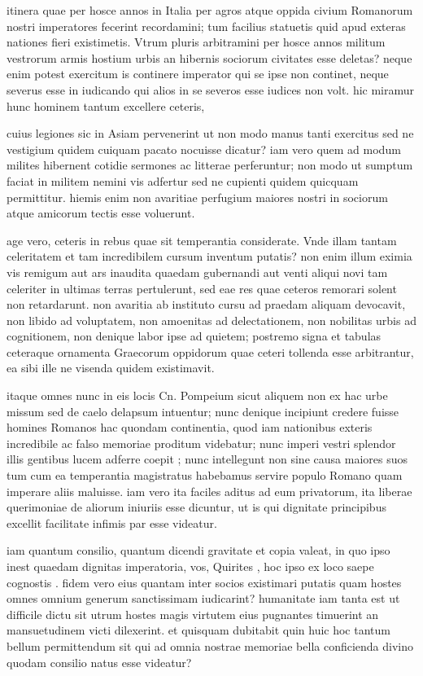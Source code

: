  itinera quae per hosce annos in Italia per agros atque oppida civium Romanorum nostri imperatores fecerint recordamini; tum facilius statuetis quid apud exteras nationes fieri existimetis. Vtrum pluris arbitramini per hosce annos militum vestrorum armis hostium urbis an hibernis sociorum civitates esse deletas? neque enim potest exercitum is continere imperator qui se ipse non continet, neque severus esse in iudicando qui alios in se severos esse iudices non volt. hic miramur hunc hominem tantum excellere ceteris,

 cuius legiones sic in Asiam pervenerint ut non modo manus tanti exercitus sed ne vestigium quidem cuiquam pacato nocuisse dicatur? iam vero quem ad modum milites hibernent cotidie sermones ac litterae perferuntur; non modo ut sumptum faciat in militem nemini vis adfertur sed ne cupienti quidem quicquam permittitur. hiemis enim non avaritiae perfugium maiores nostri in sociorum atque amicorum tectis esse voluerunt.

 age vero, ceteris in rebus quae sit temperantia considerate. Vnde illam tantam celeritatem et tam incredibilem cursum inventum putatis? non enim illum eximia vis remigum aut ars inaudita quaedam gubernandi aut venti aliqui novi tam celeriter in ultimas terras pertulerunt, sed eae res quae ceteros remorari solent non retardarunt. non avaritia ab instituto cursu ad praedam aliquam devocavit, non libido ad voluptatem, non amoenitas ad delectationem, non nobilitas urbis ad cognitionem, non denique labor ipse ad quietem; postremo signa et tabulas ceteraque ornamenta Graecorum oppidorum quae ceteri tollenda esse arbitrantur, ea sibi ille ne visenda quidem existimavit.

 itaque omnes nunc in eis locis Cn. Pompeium sicut aliquem non ex hac urbe missum sed de caelo delapsum intuentur; nunc denique incipiunt credere fuisse homines Romanos hac quondam continentia, quod iam nationibus exteris incredibile ac falso memoriae proditum videbatur; nunc imperi vestri splendor illis gentibus lucem adferre coepit ; nunc intellegunt non sine causa maiores suos tum cum ea temperantia magistratus habebamus servire populo Romano quam imperare aliis maluisse. iam vero ita faciles aditus ad eum privatorum, ita liberae querimoniae de aliorum iniuriis esse dicuntur, ut is qui dignitate principibus excellit facilitate infimis par esse videatur.

 iam quantum consilio, quantum dicendi gravitate et copia valeat, in quo ipso inest quaedam dignitas imperatoria, vos, Quirites , hoc ipso ex loco saepe cognostis . fidem vero eius quantam inter socios existimari putatis quam hostes omnes omnium generum sanctissimam iudicarint? humanitate iam tanta est ut difficile dictu sit utrum hostes magis virtutem eius pugnantes timuerint an mansuetudinem victi dilexerint. et quisquam dubitabit quin huic hoc tantum bellum permittendum sit qui ad omnia nostrae memoriae bella conficienda divino quodam consilio natus esse videatur?

